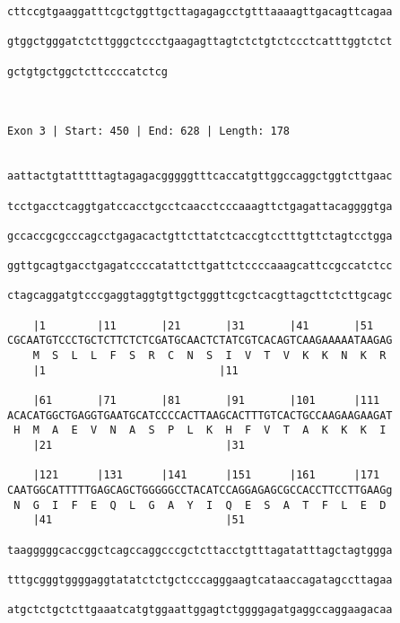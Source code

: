 \documentclass{article}
\begin{document}
\begin{Verbatim}
cttccgtgaaggatttcgctggttgcttagagagcctgtttaaaagttgacagttcagaa
                                                            
gtggctgggatctcttgggctccctgaagagttagtctctgtctccctcatttggtctct
                                                            
gctgtgctggctcttccccatctcg
                         
                         
 
Exon 3 | Start: 450 | End: 628 | Length: 178


aattactgtatttttagtagagacgggggtttcaccatgttggccaggctggtcttgaac
                                                            
tcctgacctcaggtgatccacctgcctcaacctcccaaagttctgagattacaggggtga
                                                            
gccaccgcgcccagcctgagacactgttcttatctcaccgtcctttgttctagtcctgga
                                                            
ggttgcagtgacctgagatccccatattcttgattctccccaaagcattccgccatctcc
                                                            
ctagcaggatgtcccgaggtaggtgttgctgggttcgctcacgttagcttctcttgcagc
                                                            
    |1        |11       |21       |31       |41       |51   
CGCAATGTCCCTGCTCTTCTCTCGATGCAACTCTATCGTCACAGTCAAGAAAAATAAGAG
    M  S  L  L  F  S  R  C  N  S  I  V  T  V  K  K  N  K  R 
    |1                           |11                       
  
    |61       |71       |81       |91       |101      |111  
ACACATGGCTGAGGTGAATGCATCCCCACTTAAGCACTTTGTCACTGCCAAGAAGAAGAT
 H  M  A  E  V  N  A  S  P  L  K  H  F  V  T  A  K  K  K  I 
    |21                           |31                       
  
    |121      |131      |141      |151      |161      |171  
CAATGGCATTTTTGAGCAGCTGGGGGCCTACATCCAGGAGAGCGCCACCTTCCTTGAAGg
 N  G  I  F  E  Q  L  G  A  Y  I  Q  E  S  A  T  F  L  E  D 
    |41                           |51                       
  
taagggggcaccggctcagccaggcccgctcttacctgtttagatatttagctagtggga
                                                            
tttgcgggtggggaggtatatctctgctcccagggaagtcataaccagatagccttagaa
                                                            
atgctctgctcttgaaatcatgtggaattggagtctggggagatgaggccaggaagacaa
                                                            

\end{Verbatim}
\end{document}
